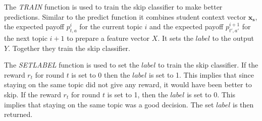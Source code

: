 The \textit{TRAIN} function is used to train the skip classifier to make better predictions. Similar to the predict function it combines student context vector $\mathbf{x_s}$, the expected payoff $p^{i}_{t,a}$ for the current topic $i$ and the expected payoff $p^{i+1}_{t',a'}$ for the next topic $i+1$ to prepare a feature vector $X$. It sets the $label$ to the output $Y$. Together they train the skip classifier. \par

The \textit{SETLABEL} function is used to set the $label$ to train the skip classifier. If the reward $r_t$ for round $t$ is set to 0 then the $label$ is set to 1. This implies that since staying on the same topic did not give any reward, it would have been better to skip. If the reward $r_t$ for round $t$ is set to 1, then the $label$ is set to 0. This implies that staying on the same topic was a good decision. The set $label$ is then returned. \par